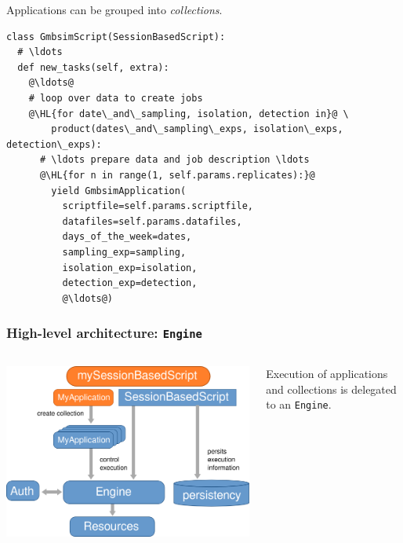 \documentclass[english,serif,mathserif,xcolor=pdftex,dvipsnames,table]{beamer}
\begin{document}
\begin{frame}[fragile]
  \begin{center}
    Applications can be grouped into \emph{collections}.
  \end{center}
  \begin{lstlisting}[showstringspaces=false,basicstyle=\tiny\ttfamily]
class GmbsimScript(SessionBasedScript):
  # \ldots
  def new_tasks(self, extra):
    @\ldots@
    # loop over data to create jobs
    @\HL{for date\_and\_sampling, isolation, detection in}@ \
        product(dates\_and\_sampling\_exps, isolation\_exps, detection\_exps):
      # \ldots prepare data and job description \ldots
      @\HL{for n in range(1, self.params.replicates):}@
        yield GmbsimApplication(
          scriptfile=self.params.scriptfile,
          datafiles=self.params.datafiles,
          days_of_the_week=dates,
          sampling_exp=sampling,
          isolation_exp=isolation,
          detection_exp=detection,
          @\ldots@)
  \end{lstlisting}
\end{frame}

\begin{frame}
  \frametitle{High-level architecture: \texttt{Engine}}
  \begin{columns}
    \begin{column}{0.5\textwidth}
      \includegraphics[width=1\textwidth]{fig/GC3Pie_execution_model}
    \end{column}
    \begin{column}{0.6\textwidth}
      \begin{flushright}
        Execution of applications and collections is delegated to an
        \texttt{Engine}.
      \end{flushright}
    \end{column}
  \end{columns}
\end{frame}
\end{document}
